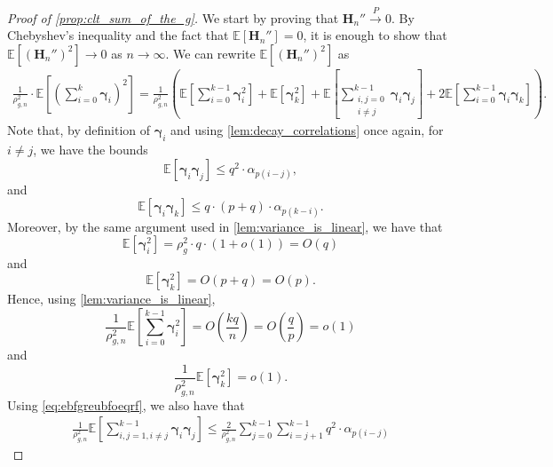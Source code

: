 \documentclass[11pt,a4paper,oneside]{article}
\theoremstyle{definition}
\theoremstyle{remark}
\def\E{\mathbb{E}}
\begin{document}
\begin{proof}[Proof of \cref{prop:clt_sum_of_the_g}]
	We start by proving that $\bm H_n''  \xrightarrow{P} 0$. By 
	Chebyshev's inequality and the fact that $\E[\bm H_n'']=0$, it is enough to show that $\E \left[\left( \bm H_n''\right)^2\right] \to 0$ as $n \to \infty$. 
	We can rewrite $\E \left[\left( \bm H_n''\right)^2\right]$ as
	\begin{multline}
	 \frac{1	}{\rho_{g,n}^2} \cdot \E \left[\left(  \sum_{i=0}^{k} \bm \gamma_i \right)^2\right]
		=  \frac{1	}{\rho_{g,n}^2} 
		\left(
		 \E \left[ \sum_{i=0}^{k-1} \bm \gamma_i^2  \right] 
		 +  \E \left[\bm \gamma_k^2 \right]
		+\E \left[  \sum_{ \substack{ i,j=0\\i \neq j} }^{k-1} \bm \gamma_i \bm \gamma_j \right] 
		+ 2 \E \left[ \sum_{i=0}^{k-1} \bm \gamma_i \bm \gamma_k \right] 
		\right).
	\end{multline}
	Note that, by definition of $\bm \gamma_i$ and using \cref{lem:decay_correlations} once again, for $i\neq j$, we have the bounds 
	\begin{equation}\label{eq:ebfgreubfoeqrf}
		\E \left[  \bm \gamma_i \bm \gamma_j \right] \leq q^2 \cdot \alpha_{p(i-j)},
	\end{equation}
	and 
	\begin{equation}
	\E \left[  \bm \gamma_i \bm \gamma_k \right] \leq q \cdot (p+q) \cdot \alpha_{p(k-i)}.
	\end{equation}
	Moreover, by the same argument used in \cref{lem:variance_is_linear}, we have that
		\begin{equation}
	\E \left[  \bm \gamma_i^2  \right] = \rho_g^2 \cdot q \cdot (1+o(1))=O(q)
	\end{equation}
	and 
		\begin{equation}
	\E \left[  \bm \gamma_k^2  \right] = O(p+q) = O(p).
	\end{equation}
	Hence, using \cref{lem:variance_is_linear},
	\begin{equation}
	\frac{1}{\rho_{g,n}^2} \E \left[ \sum_{i=0}^{k-1} \bm \gamma_i^2  \right] = O\left(\frac{kq}{n}\right) = O\left(\frac{q}{p}\right) = o(1)
	\end{equation}
	and 
	\begin{equation}
	 \frac{1	}{\rho_{g,n}^2} \E \left[\bm \gamma_k^2 \right] = o(1).
	\end{equation}
	Using \cref{eq:ebfgreubfoeqrf}, we also have that 
	\begin{multline}
		 \frac{1}{\rho_{g,n}^2} \E \left[  \sum_{i,j=1, i \neq j}^{k-1} \bm \gamma_i \bm \gamma_j \right] 
		 \leq  
		 \frac{2}{\rho_{g,n}^2}  \sum_{j=0}^{k-1} \sum_{i=j+1}^{k-1} q^2 \cdot \alpha_{p(i-j)} 

\end{multline}
\end{proof}
\end{document}
